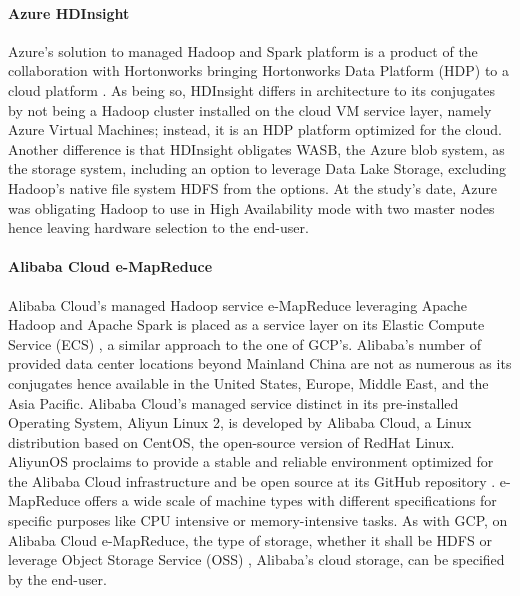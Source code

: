 \documentclass[review]{elsarticle}
\begin{document}
\paragraph{Azure HDInsight \cite{noauthor_azure_nodate}}Azure's solution to managed Hadoop and Spark platform is a product of the collaboration with Hortonworks bringing Hortonworks Data Platform (HDP) to a cloud platform \cite{noauthor_azuravail_nodate}. As being so, HDInsight differs in architecture to its conjugates by not being a Hadoop cluster installed on the cloud VM service layer, namely Azure Virtual Machines; instead, it is an HDP platform optimized for the cloud. Another difference is that HDInsight obligates WASB, the Azure blob system, as the storage system, including an option to leverage Data Lake Storage, excluding Hadoop's native file system HDFS from the options. At the study's date, Azure was obligating Hadoop to use in High Availability mode with two master nodes hence leaving hardware selection to the end-user.

\paragraph{Alibaba Cloud e-MapReduce \cite{noauthor_what_nodate}}Alibaba Cloud's managed Hadoop service e-MapReduce leveraging Apache Hadoop and Apache Spark is placed as a service layer on its Elastic Compute Service (ECS) \cite{noauthor_alielastic_nodate}, a similar approach to the one of GCP's. Alibaba's number of provided data center locations beyond Mainland China are not as numerous as its conjugates hence available in the United States, Europe, Middle East, and the Asia Pacific. Alibaba Cloud's managed service distinct in its pre-installed Operating System, Aliyun Linux 2, is developed by Alibaba Cloud, a Linux distribution based on CentOS, the open-source version of RedHat Linux. AliyunOS proclaims to provide a stable and reliable environment optimized for the Alibaba Cloud infrastructure and be open source at its GitHub repository \cite{noauthor_alibaba_nodate}. e-MapReduce offers a wide scale of machine types with different specifications for specific purposes like CPU intensive or memory-intensive tasks. As with GCP, on Alibaba Cloud e-MapReduce, the type of storage, whether it shall be HDFS or leverage Object Storage Service (OSS) \cite{noauthor_oss_nodate}, Alibaba's cloud storage, can be specified by the end-user.
\end{document}
